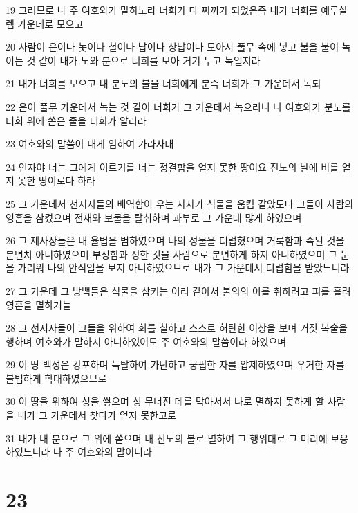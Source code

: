 \par 19 그러므로 나 주 여호와가 말하노라 너희가 다 찌끼가 되었은즉 내가 너희를 예루살렘 가운데로 모으고
\par 20 사람이 은이나 놋이나 철이나 납이나 상납이나 모아서 풀무 속에 넣고 불을 불어 녹이는 것 같이 내가 노와 분으로 너희를 모아 거기 두고 녹일지라
\par 21 내가 너희를 모으고 내 분노의 불을 너희에게 분즉 너희가 그 가운데서 녹되
\par 22 은이 풀무 가운데서 녹는 것 같이 너희가 그 가운데서 녹으리니 나 여호와가 분노를 너희 위에 쏟은 줄을 너희가 알리라
\par 23 여호와의 말씀이 내게 임하여 가라사대
\par 24 인자야 너는 그에게 이르기를 너는 정결함을 얻지 못한 땅이요 진노의 날에 비를 얻지 못한 땅이로다 하라
\par 25 그 가운데서 선지자들의 배역함이 우는 사자가 식물을 움킴 같았도다 그들이 사람의 영혼을 삼켰으며 전재와 보물을 탈취하며 과부로 그 가운데 많게 하였으며
\par 26 그 제사장들은 내 율법을 범하였으며 나의 성물을 더럽혔으며 거룩함과 속된 것을 분변치 아니하였으며 부정함과 정한 것을 사람으로 분변하게 하지 아니하였으며 그 눈을 가리워 나의 안식일을 보지 아니하였으므로 내가 그 가운데서 더럽힘을 받았느니라
\par 27 그 가운데 그 방백들은 식물을 삼키는 이리 같아서 불의의 이를 취하려고 피를 흘려 영혼을 멸하거늘
\par 28 그 선지자들이 그들을 위하여 회를 칠하고 스스로 허탄한 이상을 보며 거짓 복술을 행하며 여호와가 말하지 아니하였어도 주 여호와의 말씀이라 하였으며
\par 29 이 땅 백성은 강포하며 늑탈하여 가난하고 궁핍한 자를 압제하였으며 우거한 자를 불법하게 학대하였으므로
\par 30 이 땅을 위하여 성을 쌓으며 성 무너진 데를 막아서서 나로 멸하지 못하게 할 사람을 내가 그 가운데서 찾다가 얻지 못한고로
\par 31 내가 내 분으로 그 위에 쏟으며 내 진노의 불로 멸하여 그 행위대로 그 머리에 보응하였느니라 나 주 여호와의 말이니라

\chapter{23}


